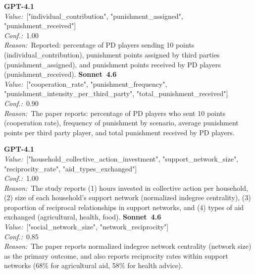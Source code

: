 \documentclass[11pt,a4paper]{article}
\begin{document}
\begin{tcolorbox}[
  title={\textbf{DVs} \textbar{} DOI: 10.1016\_j.jebo.2018.04.002 \textbar{} Cond.~0},
  colback=blue!3!white,
  colframe=blue!45!black,
  fonttitle=\small\sffamily,
  sidebyside,
  sidebyside align=top seam,
  lower separated=false,
  breakable,
  before upper={\small},
  before lower={\small},
]
\textbf{GPT-4.1}\\[2pt]
\textit{Value:}~["individual\_contribution", "punishment\_assigned", "punishment\_received"]\\[3pt]
\textit{Conf.:}~1.00\\[3pt]
\textit{Reason:}~Reported: percentage of PD players sending 10 points (individual\_contribution), punishment points assigned by third parties (punishment\_assigned), and punishment points received by PD players (punishment\_received).
\tcblower
\textbf{Sonnet~4.6}\\[2pt]
\textit{Value:}~["cooperation\_rate", "punishment\_frequency", "punishment\_intensity\_per\_third\_party", "total\_punishment\_received"]\\[3pt]
\textit{Conf.:}~0.90\\[3pt]
\textit{Reason:}~The paper reports: percentage of PD players who sent 10 points (cooperation rate), frequency of punishment by scenario, average punishment points per third party player, and total punishment received by PD players.
\end{tcolorbox}

\begin{tcolorbox}[
  title={\textbf{DVs} \textbar{} DOI: 10.1111\_jlca.12283 \textbar{} Cond.~0},
  colback=blue!3!white,
  colframe=blue!45!black,
  fonttitle=\small\sffamily,
  sidebyside,
  sidebyside align=top seam,
  lower separated=false,
  breakable,
  before upper={\small},
  before lower={\small},
]
\textbf{GPT-4.1}\\[2pt]
\textit{Value:}~["household\_collective\_action\_investment", "support\_network\_size", "reciprocity\_rate", "aid\_types\_exchanged"]\\[3pt]
\textit{Conf.:}~1.00\\[3pt]
\textit{Reason:}~The study reports (1) hours invested in collective action per household, (2) size of each household's support network (normalized indegree centrality), (3) proportion of reciprocal relationships in support networks, and (4) types of aid exchanged (agricultural, health, food).
\tcblower
\textbf{Sonnet~4.6}\\[2pt]
\textit{Value:}~["social\_network\_size", "network\_reciprocity"]\\[3pt]
\textit{Conf.:}~0.85\\[3pt]
\textit{Reason:}~The paper reports normalized indegree network centrality (network size) as the primary outcome, and also reports reciprocity rates within support networks (68\% for agricultural aid, 58\% for health advice).
\end{tcolorbox}
\end{document}
